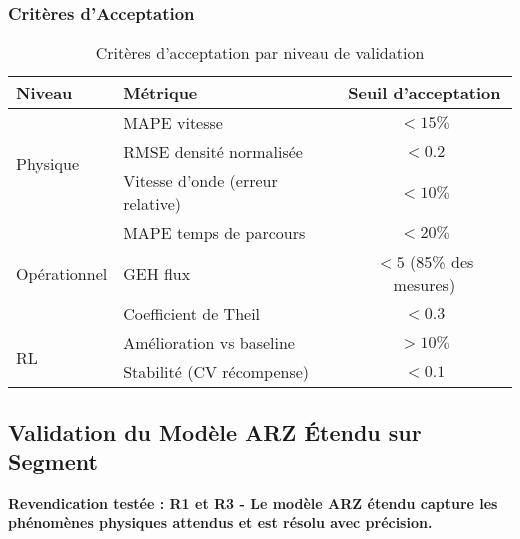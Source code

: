 \subsubsection{Critères d'Acceptation}
\label{subsec:criteres_acceptation}

\begin{table}[htbp]
    \centering
    \caption{Critères d'acceptation par niveau de validation}
    \label{tab:criteres_acceptation}
    \begin{tabular}{|l|l|c|}
        \hline
        \textbf{Niveau}               & \textbf{Métrique}                & \textbf{Seuil d'acceptation} \\
        \hline
        \multirow{3}{*}{Physique}     & MAPE vitesse                     & $< 15\%$                     \\
                                      & RMSE densité normalisée          & $< 0.2$                      \\
                                      & Vitesse d'onde (erreur relative) & $< 10\%$                     \\
        \hline
        \multirow{3}{*}{Opérationnel} & MAPE temps de parcours           & $< 20\%$                     \\
                                      & GEH flux                         & $< 5$ (85\% des mesures)     \\
                                      & Coefficient de Theil             & $< 0.3$                      \\
        \hline
        \multirow{2}{*}{RL}           & Amélioration vs baseline         & $> 10\%$                     \\
                                      & Stabilité (CV récompense)        & $< 0.1$                      \\
        \hline
    \end{tabular}
\end{table}


\subsection{Validation du Modèle ARZ Étendu sur Segment}
\label{sec:validation_arz_segment}

\textbf{Revendication testée : R1 et R3 - Le modèle ARZ étendu capture les phénomènes physiques attendus et est résolu avec précision.}

